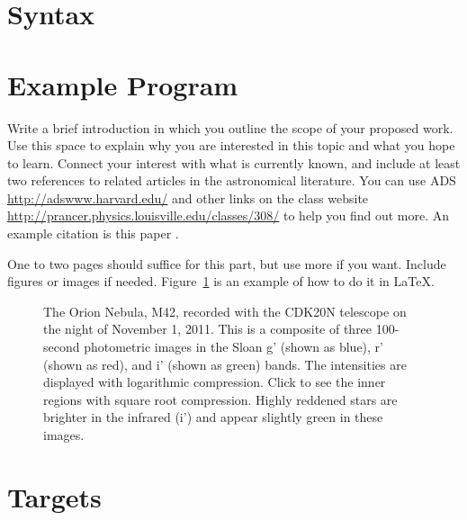 \documentclass[dvips,12pt]{article}
\newcommand{\includecode}[1]{}
\begin{document}
\section{Syntax}

\section{Example Program}

\includecode{../example/timed-blinking-light/timed-blinking-light.vs}

\includecode{../example/timed-blinking-light/timer.vs}

\iffalse

Write a brief introduction in which you  outline the scope of your proposed
work. Use this space to explain why you are interested in this topic and what
you hope to learn. Connect your interest with what is currently known, and
include at least two references to related articles in the astronomical
literature.  You can use ADS  \url{http://adswww.harvard.edu/} and other links
on the class website \url{http://prancer.physics.louisville.edu/classes/308/} 
to help you find out more. An example citation is this paper
\cite{gonzalez2012}.

One to two pages should suffice for this part, but use more if you want.  
Include figures or images if needed.  Figure~\ref{m42} is an example of  how to
do it in \LaTeX.


\begin{figure}
\begin{center}
\end{center}

\caption{The Orion Nebula, M42, recorded with the CDK20N telescope on the night
of November 1, 2011. This is a composite of three 100-second photometric images
in the Sloan g' (shown as blue), r' (shown as red), and i' (shown as green)
bands. The intensities are displayed with logarithmic compression. Click to see
the inner regions with square root compression. Highly reddened stars are
brighter in the infrared (i') and appear slightly green in these images.
\label{m42}}

\end{figure}


\section{Targets}
\end{document}
